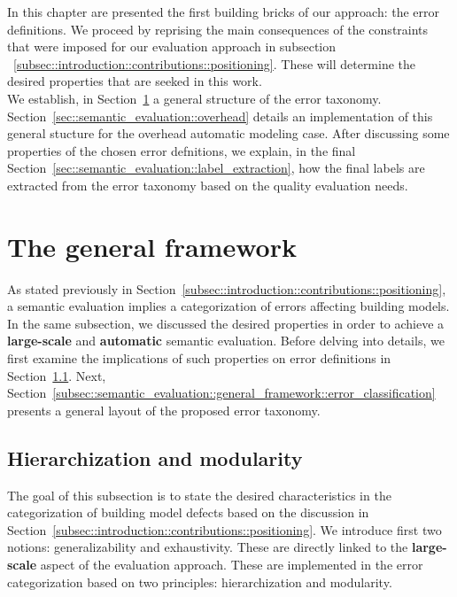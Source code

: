 \minitoc

\vfill

In this chapter are presented the first building bricks of our approach: the error definitions.
We proceed by reprising the main consequences of the constraints that were imposed for our evaluation approach in subsection ~\ref{subsec::introduction::contributions::positioning}.
These will determine the desired properties that are seeked in this work.\\

We establish, in Section~\ref{sec::semantic_evaluation::general_framework} a general structure of the error taxonomy.
Section~\ref{sec::semantic_evaluation::overhead} details an implementation of this general stucture for the overhead automatic modeling case.
After discussing some properties of the chosen error defnitions, we explain, in the final Section~\ref{sec::semantic_evaluation::label_extraction}, how the final labels are extracted from the error taxonomy based on the quality evaluation needs.

\clearpage

\section{The general framework}
    \label{sec::semantic_evaluation::general_framework}
    As stated previously in Section~\ref{subsec::introduction::contributions::positioning}, a semantic evaluation implies a categorization of errors affecting building models.
    In the same subsection, we discussed the desired properties in order to achieve a \textbf{large-scale} and \textbf{automatic} semantic evaluation.
    Before delving into details, we first examine the implications of such properties on error definitions in Section~\ref{subsec::semantic_evaluation::general_framework::hierarchization_moderularity}.
    Next, Section~\ref{subsec::semantic_evaluation::general_framework::error_classification} presents a general layout of the proposed error taxonomy.

    \subsection{Hierarchization and modularity}
        \label{subsec::semantic_evaluation::general_framework::hierarchization_moderularity}
        The goal of this subsection is to state the desired characteristics in the categorization of building model defects based on the discussion in Section~\ref{subsec::introduction::contributions::positioning}.
        We introduce first two notions: generalizability and exhaustivity.
        These are directly linked to the \textbf{large-scale} aspect of the evaluation approach.
        These are implemented in the error categorization based on two principles: hierarchization and modularity.


